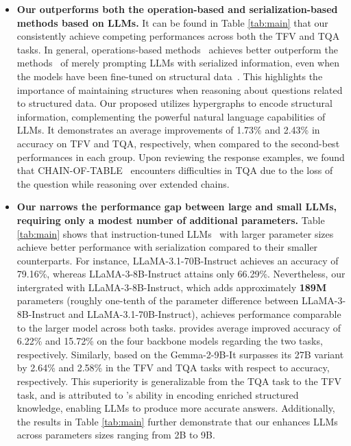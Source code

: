 {\begin{itemize}[leftmargin=*]
\item \textbf{Our \name outperforms both the operation-based and serialization-based methods based on LLMs.} It can be found in Table \ref{tab:main} that our \name consistently achieve competing performances across both the TFV and TQA tasks. In general, operations-based methods~\cite{rajkumar2022evaluating,dater,wang2024chainoftable} achieves better outperform the methods~\cite{openai2023gpt35turbo,gpt4ominiurl,zhang2024tablellama,gemma,touvron2024llama3,hu2022lora} of merely prompting LLMs with serialized information, even when the models have been fine-tuned on structural data~\cite{zhang2024tablellama}. This highlights the importance of maintaining structures when reasoning about questions related to structured data. Our proposed \name utilizes hypergraphs to encode structural information, complementing the powerful natural language capabilities of LLMs. It demonstrates an average improvements of 1.73\% and 2.43\% in accuracy on TFV and TQA, respectively, when compared to the second-best performances in each group. Upon reviewing the response examples, we found that CHAIN-OF-TABLE~\cite{wang2024chainoftable} encounters difficulties in TQA due to the loss of the question while reasoning over extended chains.
    \item \textbf{Our \name narrows the performance gap between large and small LLMs, requiring only a modest number of additional parameters.} Table \ref{tab:main} shows that instruction-tuned LLMs~\cite{gemma,touvron2024llama3,zhang2024tablellama} with larger parameter sizes achieve better performance with serialization compared to their smaller counterparts. For instance, LLaMA-3.1-70B-Instruct achieves an accuracy of 79.16\%, whereas LLaMA-3-8B-Instruct attains only 66.29\%. Nevertheless, our \name intergrated with LLaMA-3-8B-Instruct, which adds approximately \textbf{189M} parameters (roughly one-tenth of the parameter difference between LLaMA-3-8B-Instruct and LLaMA-3.1-70B-Instruct),  achieves performance comparable to the larger model across both tasks. \name provides average improved accuracy of 6.22\% and 15.72\% on the four backbone models regarding the two tasks, respectively. Similarly, \name based on the Gemma-2-9B-It surpasses its 27B variant by 2.64\% and 2.58\% in the TFV and TQA tasks with respect to accuracy, respectively. This superiority is generalizable from the TQA task to the TFV task, and is attributed to \name's ability in encoding enriched structured knowledge, enabling LLMs to produce more accurate answers. Additionally, the results in Table \ref{tab:main} further demonstrate that our \name enhances LLMs across parameters sizes ranging from 2B to 9B.


\end{itemize}}
